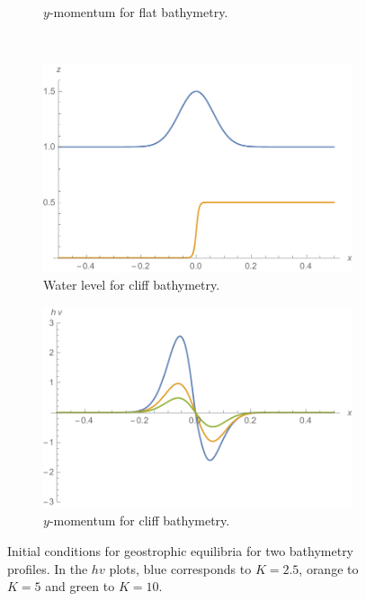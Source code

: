 \begin{figure}
\begin{subfigure}{0.45\textwidth}
    \caption{$y$-momentum for flat bathymetry.}
    \label{fig:init-geo-flat-hv}
  \end{subfigure} \\
  \begin{subfigure}{0.45\textwidth}
    \includegraphics[width=\textwidth]{diagrams/init-geo-cliff-h}
    \caption{Water level for cliff bathymetry.}
    \label{fig:init-geo-cliff-h}
  \end{subfigure}
  \begin{subfigure}{0.45\textwidth}
    \includegraphics[width=\textwidth]{diagrams/init-geo-cliff-hv}
    \caption{$y$-momentum for cliff bathymetry.}
    \label{fig:init-geo-cliff-hv}
  \end{subfigure}
  \caption{Initial conditions for geostrophic equilibria for two bathymetry profiles. In the $hv$ plots, blue corresponds to $K = 2.5$, orange to $K = 5$ and green to $K = 10$.}
  \label{fig:init_geo}
\end{figure}

